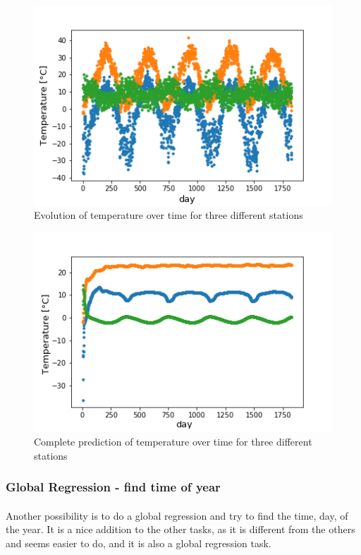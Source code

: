 \documentclass[11pt]{report}
\begin{document}
\begin{figure}[!ht]
    \centering
    \includegraphics[width=0.6\linewidth]{figures/evolution_temp.png}
    \caption{Evolution of temperature over time for three different stations}
    \label{fig:evol_temp}
\end{figure}


\begin{figure}[!ht]
    \centering
    \includegraphics[width=0.6\linewidth]{figures/prediction_temp.png}
    \caption{Complete prediction of temperature over time for three different stations}
    \label{fig:predict_temp}
\end{figure}
\newpage
\subsubsection{Global Regression - find time of year}
\paragraph*{}
Another possibility is to do a global regression and try to find the time, day, of the year. It is a nice addition to the other tasks, as it is different from the others and seems easier to do, and it is also a global regression task.
\end{document}
